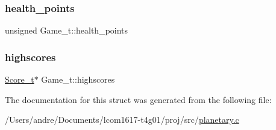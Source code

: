 \subsubsection{\texorpdfstring{health\+\_\+points}{health\_points}}
{\footnotesize\ttfamily unsigned Game\+\_\+t\+::health\+\_\+points}

\hypertarget{struct_game__t_a375852aa9a12c33759d6ab7784fa7314}{}\label{struct_game__t_a375852aa9a12c33759d6ab7784fa7314} 
\subsubsection{\texorpdfstring{highscores}{highscores}}
{\footnotesize\ttfamily \hyperlink{struct_score__t}{Score\+\_\+t}$\ast$ Game\+\_\+t\+::highscores}



The documentation for this struct was generated from the following file\+:\begin{DoxyCompactItemize}
\item 
/\+Users/andre/\+Documents/lcom1617-\/t4g01/proj/src/\hyperlink{planetary_8c}{planetary.\+c}\end{DoxyCompactItemize}
